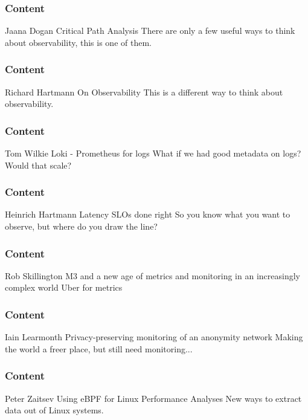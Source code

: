 \documentclass[aspectratio=169]{beamer}
\begin{document}
\begin{frame}
	\frametitle{Content}
	\begin{center}
		\vfill
		Jaana Dogan
		\vfill
		Critical Path Analysis
		\vfill
		There are only a few useful ways to think about observability, this is one of them.
		\vfill
	\end{center}
\end{frame}

\begin{frame}
	\frametitle{Content}
	\begin{center}
		\vfill
		Richard Hartmann
		\vfill
		On Observability
		\vfill
		This is a different way to think about observability.
		\vfill
	\end{center}
\end{frame}

\begin{frame}
	\frametitle{Content}
	\begin{center}
		\vfill
		Tom Wilkie
		\vfill
		Loki - Prometheus for logs
		\vfill
		What if we had good metadata on logs? Would that scale?
		\vfill
	\end{center}
\end{frame}

\begin{frame}
	\frametitle{Content}
	\begin{center}
		\vfill
		Heinrich Hartmann
		\vfill
		Latency SLOs done right
		\vfill
		So you know what you want to observe, but where do you draw the line?
		\vfill
	\end{center}
\end{frame}

\begin{frame}
	\frametitle{Content}
	\begin{center}
		\vfill
		Rob Skillington
		\vfill
		M3 and a new age of metrics and monitoring in an increasingly complex world
		\vfill
		Uber for metrics
		\vfill
	\end{center}
\end{frame}

\begin{frame}
	\frametitle{Content}
	\begin{center}
		\vfill
		Iain Learmonth
		\vfill
		Privacy-preserving monitoring of an anonymity network
		\vfill
		Making the world a freer place, but still need monitoring...
		\vfill
	\end{center}
\end{frame}

\begin{frame}
	\frametitle{Content}
	\begin{center}
		\vfill
		Peter Zaitsev
		\vfill
		Using eBPF for Linux Performance Analyses
		\vfill
		New ways to extract data out of Linux systems.
		\vfill
	\end{center}
\end{frame}
\end{document}
